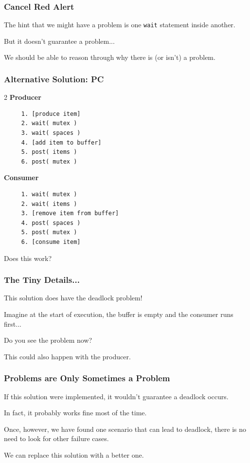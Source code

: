 \begin{frame}
	\frametitle{Cancel Red Alert}

	The hint that we might have a problem is one \texttt{wait} statement inside another.

	But it doesn't guarantee a problem...

	We should be able to reason through why there is (or isn't) a problem.

\end{frame}

\begin{frame}[fragile]
	\frametitle{Alternative Solution: PC}

	\begin{multicols}{2}
		\textbf{Producer}
		\begin{verbatim}
	 1. [produce item]
	 2. wait( mutex )
	 3. wait( spaces )
	 4. [add item to buffer]
	 5. post( items )
	 6. post( mutex )
  \end{verbatim}
		\columnbreak
		\textbf{Consumer}
		\begin{verbatim}
	 1. wait( mutex )
	 2. wait( items )
	 3. [remove item from buffer]
	 4. post( spaces )
	 5. post( mutex )
	 6. [consume item]
  \end{verbatim}
	\end{multicols}
	\vspace{-2em}

	Does this work?

\end{frame}

\begin{frame}
	\frametitle{The Tiny Details...}

	This solution does have the deadlock problem!

	Imagine at the start of execution, the buffer is empty and the consumer runs first...

	Do you see the problem now?

	This could also happen with the producer.

\end{frame}

\begin{frame}
	\frametitle{Problems are Only Sometimes a Problem}

	If this solution were implemented, it wouldn't guarantee a deadlock occurs.

	In fact, it probably works fine most of the time.


	Once, however, we have found one scenario that can lead to deadlock, there is no need to look for other failure cases.

	We can replace this solution with a better one.

\end{frame}


